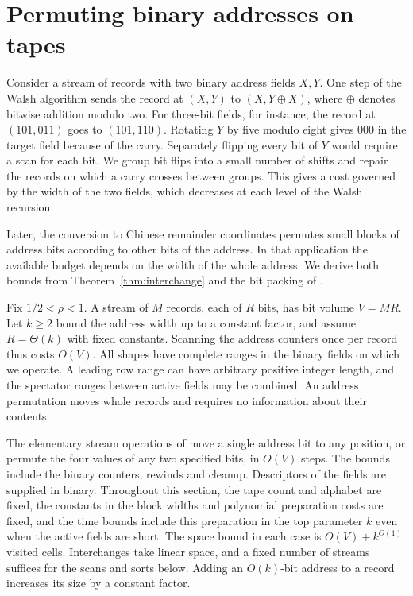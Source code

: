 \section{Permuting binary addresses on tapes}\label{sec:permutations}

Consider a stream of records with two binary address fields $X,Y$.
One step of the Walsh algorithm sends the record at $(X,Y)$ to
$(X,Y\oplus X)$, where $\oplus$ denotes bitwise addition modulo two.
For three-bit fields, for instance, the record at $(101,011)$ goes to
$(101,110)$. Rotating $Y$ by five modulo eight
gives $000$ in the target field because of the carry. Separately flipping every
bit of $Y$ would require a scan for each bit. We group bit flips into
a small number of shifts and repair the records on which a carry
crosses between groups. This gives a cost governed by the width of
the two fields, which decreases at each level of the Walsh recursion.

Later, the conversion to Chinese remainder coordinates permutes small
blocks of address bits according to other bits of the address. In that
application the available budget depends on the width of the whole
address. We derive both bounds from Theorem~\ref{thm:interchange} and
the bit packing of \cite[Section~5.2]{Tape}.

Fix $1/2<\rho<1$. A stream of $M$ records, each of $R$ bits, has bit
volume $V=MR$. Let $k\ge2$ bound the address width up to a constant
factor, and assume $R=\Theta(k)$ with fixed constants. Scanning the
address counters once per record thus costs $O(V)$. All shapes have
complete ranges in the binary fields on which we operate. A leading
row range can have arbitrary positive integer length, and the spectator
ranges between active fields may be combined. An address permutation
moves whole records and requires no information about their contents.

The elementary stream operations of \cite[Lemma~3]{Tape} move a
single address bit to any position, or permute the four values of any
two specified bits, in $O(V)$ steps. The bounds include the binary
counters, rewinds and cleanup. Descriptors of the fields are supplied
in binary. Throughout this section, the tape count and alphabet are
fixed, the constants in the block widths and polynomial preparation
costs are fixed, and the time bounds include this preparation in the
top parameter $k$ even when the active fields are short. The space
bound in each case is $O(V)+k^{O(1)}$ visited cells. Interchanges
take linear space, and a fixed number of streams suffices for the
scans and sorts below. Adding an $O(k)$-bit address to a record
increases its size by a constant factor.

